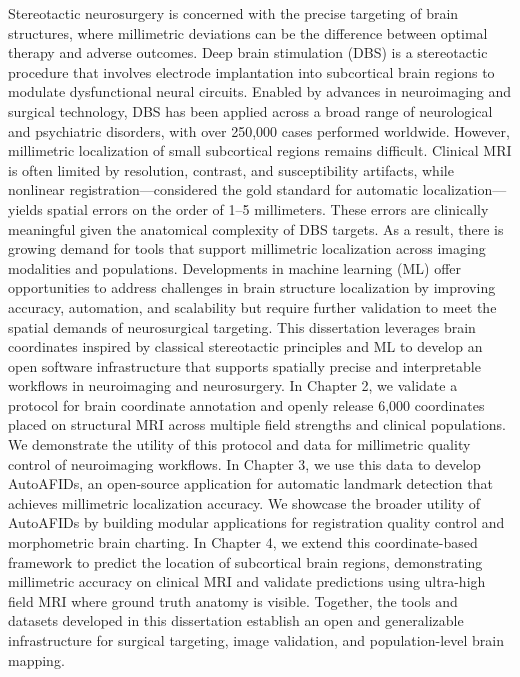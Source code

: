 \onehalfspacing
Stereotactic neurosurgery is concerned with the precise targeting of brain structures, where millimetric deviations can be the difference between optimal therapy and adverse outcomes. Deep brain stimulation (DBS) is a stereotactic procedure that involves electrode implantation into subcortical brain regions to modulate dysfunctional neural circuits. Enabled by advances in neuroimaging and surgical technology, DBS has been applied across a broad range of neurological and psychiatric disorders, with over 250,000 cases performed worldwide. However, millimetric localization of small subcortical regions remains difficult. Clinical MRI is often limited by resolution, contrast, and susceptibility artifacts, while nonlinear registration—considered the gold standard for automatic localization—yields spatial errors on the order of 1–5 millimeters. These errors are clinically meaningful given the anatomical complexity of DBS targets. As a result, there is growing demand for tools that support millimetric localization across imaging modalities and populations. Developments in machine learning (ML) offer opportunities to address challenges in brain structure localization by improving accuracy, automation, and scalability but require further validation to meet the spatial demands of neurosurgical targeting. This dissertation leverages brain coordinates inspired by classical stereotactic principles and ML to develop an open software infrastructure that supports spatially precise and interpretable workflows in neuroimaging and neurosurgery. In Chapter 2, we validate a protocol for brain coordinate annotation and openly release 6,000 coordinates placed on structural MRI across multiple field strengths and clinical populations. We demonstrate the utility of this protocol and data for millimetric quality control of neuroimaging workflows. In Chapter 3, we use this data to develop AutoAFIDs, an open-source application for automatic landmark detection that achieves millimetric localization accuracy. We showcase the broader utility of AutoAFIDs by building modular applications for registration quality control and morphometric brain charting. In Chapter 4, we extend this coordinate-based framework to predict the location of subcortical brain regions, demonstrating millimetric accuracy on clinical MRI and validate predictions using ultra-high field MRI where ground truth anatomy is visible. Together, the tools and datasets developed in this dissertation establish an open and generalizable infrastructure for surgical targeting, image validation, and population-level brain mapping.
